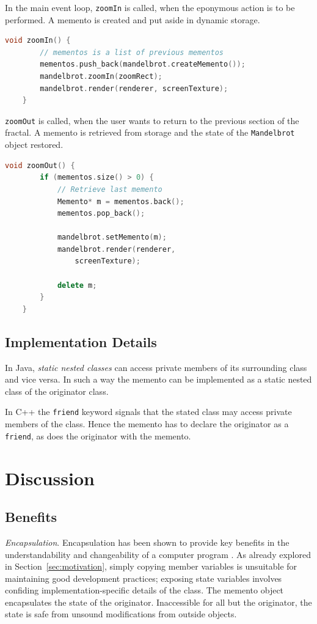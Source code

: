 \documentclass[11pt, a4paper, twoside]{article}
\begin{document}
	In the main event loop, \verb|zoomIn| is called, when the eponymous action is to be performed. A memento is created and put aside in dynamic storage.
	
	\begin{lstlisting}[language=c++, caption={Main.cpp}]
	void zoomIn() {
		// mementos is a list of previous mementos
		mementos.push_back(mandelbrot.createMemento());
		mandelbrot.zoomIn(zoomRect);
		mandelbrot.render(renderer, screenTexture);
	}
	\end{lstlisting}
	
	\verb|zoomOut| is called, when the user wants to return to the previous section of the fractal. A memento is retrieved from storage and the state of the \verb|Mandelbrot| object restored.
	
	\begin{lstlisting}[language=c++, caption={Main.cpp}]
	void zoomOut() {
		if (mementos.size() > 0) {
			// Retrieve last memento
			Memento* m = mementos.back();
			mementos.pop_back();
			
			mandelbrot.setMemento(m);
			mandelbrot.render(renderer,
				screenTexture);
			
			delete m;
		}
	}
	\end{lstlisting}
	
	\subsection{Implementation Details}
	\label{sec:impl}
	In Java, \emph{static nested classes} can access private members of its surrounding class and vice versa. In such a way the memento can be implemented as a static nested class of the originator class.
	
	In C++ the \verb|friend| keyword signals that the stated class may access private members of the class. Hence the memento has to declare the originator as a \verb|friend|, as does the originator with the memento.
	
	\section{Discussion}
	
	\subsection{Benefits}
	\label{sec:benefits}
	\emph{Encapsulation}. Encapsulation has been shown to provide key benefits in the understandability and changeability of a computer program \cite{snyder1986}. As already explored in Section~\ref{sec:motivation}, simply copying member variables is unsuitable for maintaining good development practices; exposing state variables involves confiding implementation-specific details of the class. The memento object encapsulates the state of the originator. Inaccessible for all but the originator, the state is safe from unsound modifications from outside objects. \\
	
\end{document}
